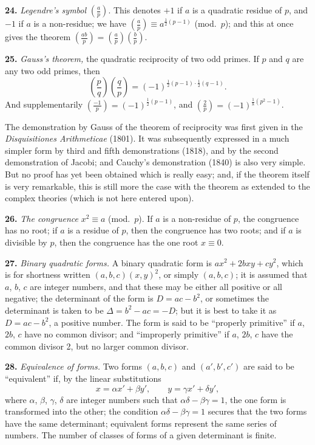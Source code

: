 \documentclass[11pt,a4paper]{book}
\begin{document}
\textbf{24.}\quad
\textit{Legendre's symbol} $\left(\frac{a}{p}\right)$. This denotes $+1$ if $a$ is a quadratic residue of $p$, and $-1$ if $a$ is a non-residue; we have $\left(\frac{a}{p}\right) \equiv a^{\frac{1}{2}(p-1)}$ (mod.\ $p$); and this at once gives the theorem $\left(\frac{ab}{p}\right) = \left(\frac{a}{p}\right)\left(\frac{b}{p}\right)$.

\textbf{25.}\quad
\textit{Gauss's theorem,} the quadratic reciprocity of two odd primes. If $p$ and $q$ are any two odd primes, then
\[
\left(\frac{p}{q}\right)\left(\frac{q}{p}\right) = (-1)^{\frac{1}{2}(p-1) \cdot \frac{1}{2}(q-1)}.
\]
And supplementarily $\left(\frac{-1}{p}\right) = (-1)^{\frac{1}{2}(p-1)}$, and $\left(\frac{2}{p}\right) = (-1)^{\frac{1}{8}(p^{2}-1)}$.

The demonstration by Gauss of the theorem of reciprocity was first given in the \textit{Disquisitiones Arithmeticae} (1801). It was subsequently expressed in a much simpler form by third and fifth demonstrations (1818), and by the second demonstration of Jacobi; and Cauchy's demonstration (1840) is also very simple. But no proof has yet been obtained which is really easy; and, if the theorem itself is very remarkable, this is still more the case with the theorem as extended to the complex theories (which is not here entered upon).

\textbf{26.}\quad
\textit{The congruence} $x^{2} \equiv a$ (mod.\ $p$). If $a$ is a non-residue of $p$, the congruence has no root; if $a$ is a residue of $p$, then the congruence has two roots; and if $a$ is divisible by $p$, then the congruence has the one root $x \equiv 0$.

\textbf{27.}\quad
\textit{Binary quadratic forms.} A binary quadratic form is $ax^{2} + 2bxy + cy^{2}$, which is for shortness written $(a, b, c)(x, y)^{2}$, or simply $(a, b, c)$; it is assumed that $a$, $b$, $c$ are integer numbers, and that these may be either all positive or all negative; the determinant of the form is $D = ac - b^{2}$, or sometimes the determinant is taken to be $\Delta = b^{2} - ac = -D$; but it is best to take it as $D = ac - b^{2}$, a positive number. The form is said to be ``properly primitive'' if $a$, $2b$, $c$ have no common divisor; and ``improperly primitive'' if $a$, $2b$, $c$ have the common divisor 2, but no larger common divisor.

\textbf{28.}\quad
\textit{Equivalence of forms.} Two forms $(a, b, c)$ and $(a', b', c')$ are said to be ``equivalent'' if, by the linear substitutions
\[
x = \alpha x' + \beta y', \qquad y = \gamma x' + \delta y',
\]
where $\alpha$, $\beta$, $\gamma$, $\delta$ are integer numbers such that $\alpha\delta - \beta\gamma = 1$, the one form is transformed into the other; the condition $\alpha\delta - \beta\gamma = 1$ secures that the two forms have the same determinant; equivalent forms represent the same series of numbers. The number of classes of forms of a given determinant is finite.
\end{document}
